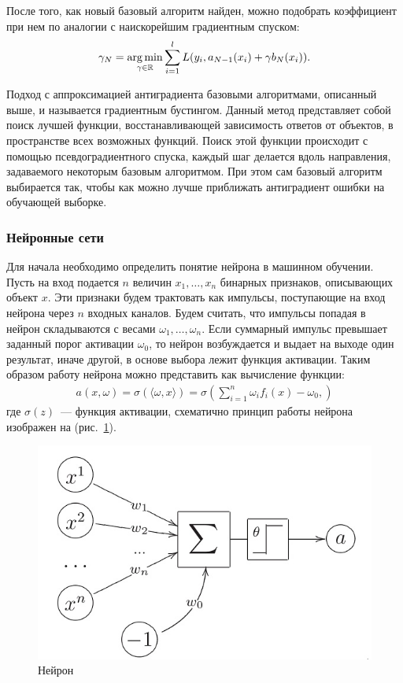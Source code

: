 \documentclass[12pt,a4paper]{article} %
\begin{document}
После того, как новый базовый алгоритм найден, можно подобрать коэффициент при нем по аналогии с наискорейшим градиентным спуском:
\begin{gather}\label{gradbust8}
\gamma_N = \mathop{\rm arg\,min}\limits_{\gamma\in\mathbb{R}}\sum\limits_{i=1}^{l}L(y_i, a_{N-1}(x_i) + \gamma b_N(x_i)).
\end{gather}

Подход с аппроксимацией антиградиента базовыми алгоритмами, описанный выше, и называется градиентным бустингом. Данный метод представляет собой поиск лучшей функции, восстанавливающей зависимость ответов от объектов, в пространстве всех возможных функций. Поиск этой функции происходит с помощью псевдоградиентного спуска, каждый шаг делается вдоль направления, задаваемого некоторым базовым алгоритмом. При этом сам базовый алгоритм выбирается так, чтобы как можно лучше приближать антиградиент ошибки на обучающей выборке.  

\subsubsection{Нейронные сети}
Для начала необходимо определить понятие нейрона в машинном обучении. Пусть на вход подается $n$ величин $x_1,\dots, x_n$ бинарных признаков, описывающих объект $x$. Эти признаки будем трактовать как импульсы, поступающие на вход нейрона через $n$ входных каналов. Будем считать, что импульсы попадая в нейрон складываются с весами $\omega_1,\dots,\omega_n$. Если суммарный импульс превышает заданный порог активации $\omega_0$, то нейрон возбуждается и выдает на выходе один результат, иначе другой, в основе выбора лежит функция активации. Таким образом работу нейрона можно представить как вычисление функции:
\begin{gather}\label{ney1}
	a(x,\omega) = \sigma(\langle \omega, x \rangle) = \sigma\left(\sum\limits_{i=1}^{n} \omega_if_i(x)-\omega_0, \right)
\end{gather}
где $\sigma(z)$~--- функция активации, схематично принцип работы нейрона изображен на (рис.~\ref{fig:neyron}).

\begin{figure}[h]
	
	\centering
	
	\includegraphics[width=0.5\linewidth]{neyron.jpg}
	
	\caption{Нейрон}
	
	\label{fig:neyron}
	
\end{figure}
\end{document}
